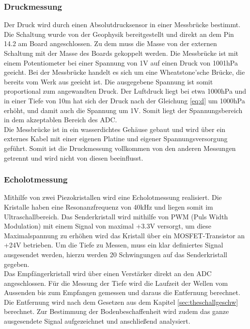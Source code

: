 \documentclass[12pt,a4paper,titlepage,headinclude,bibtotoc]{scrartcl}
\numberwithin{equation}{subsection}
\begin{document}
\subsubsection{Druckmessung}
\label{sec:durchdruck}
Der Druck wird durch einen Absolutdrucksensor in einer Messbrücke bestimmt.
Die Schaltung wurde von der Geophysik bereitgestellt und direkt an dem Pin 14.2 am Board angeschlossen.
Zu dem muss die Masse von der externen Schaltung mit der Masse des Boards gekoppelt werden.
Die Messbrücke ist mit einem Potentiometer bei einer Spannung von 1\si{\volt} auf einen Druck von 1001hPa geeicht.
Bei der Messbrücke handelt es sich um  eine Wheatstone'sche Brücke, die bereits vom Werk aus geeicht ist.
Die ausgegebene Spannung ist somit proportional zum angewandten Druck.
Der Luftdruck liegt bei etwa 1000hPa und in einer Tiefe von 10\si{\meter} hat sich der Druck nach der Gleichung \eqref{eq:d} um 1000hPa erhöht, und damit auch die Spannung um 1\si{\volt}.
Somit liegt der Spannungsbereich in dem akzeptablen Bereich des ADC.\\
Die Messbrücke ist in ein wasserdichtes Gehäuse gebaut und wird über ein externes Kabel mit einer eigenen Platine und eigener Spannungsversorgung geführt.
Somit ist die Druckmessung vollkommen von den anderen Messungen getrennt und wird nicht von diesen beeinflusst.

\subsubsection{Echolotmessung}
Mithilfe von zwei Piezokristallen wird eine Echolotmessung realisiert.
Die Kristalle haben eine Resonanzfrequenz von 40\si{\kilo\hertz} und liegen somit im Ultraschallbereich.
Das Senderkristall wird mithilfe von PWM (Puls Width Modulation) mit einem Signal von maximal +3.3\si{\volt} versorgt, um diese Maximalspannung zu erhöhen wird das Kristall über ein MOSFET-Transistor an +24\si{\volt} betrieben.
Um die Tiefe zu Messen, muss ein klar definiertes Signal ausgesendet werden, hierzu werden 20 Schwingungen auf das Senderkristall gegeben.\\
Das Empfängerkristall wird über einen Verstärker direkt an den ADC angeschlossen.
Für die Messung der Tiefe wird die Laufzeit der Wellen vom Aussenden bis zum Empfangen gemessen und daraus die Entfernung berechnet.
Die Entfernung wird nach dem Gesetzen aus dem Kapitel \ref{sec:theschallgeschw} berechnet.
Zur Bestimmung der Bodenbeschaffenheit wird zudem das ganze ausgesendete Signal aufgezeichnet und anschließend analysiert.
\end{document}

